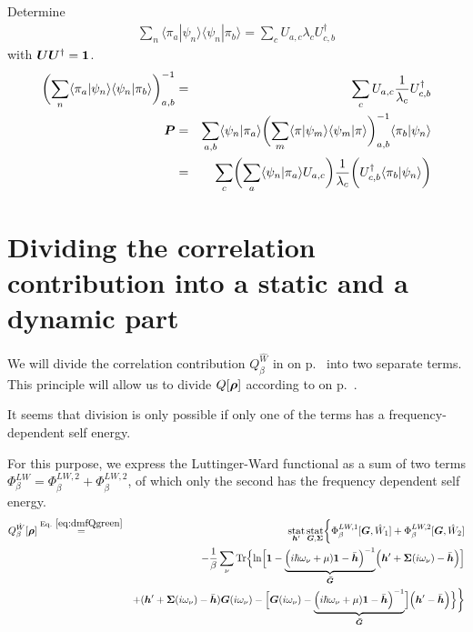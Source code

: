 \documentclass[11pt,a4paper]{report}
\begin{document}
Determine
\begin{eqnarray}
\sum_n\langle\pi_a|\psi_n\rangle\langle\psi_n|\pi_b\rangle
=\sum_{c} U_{a,c}\lambda_c U^\dagger_{c,b}
\end{eqnarray}
with $\bm{U}\bm{U}^\dagger=\bm{1}$.
\begin{eqnarray}
\biggl(\sum_n\langle\pi_a|\psi_n\rangle
\langle\psi_n|\pi_b\rangle\biggr)^{-1}_{a,b}
&=&\sum_{c} U_{a,c}\frac{1}{\lambda_c} U^\dagger_{c,b}
\nonumber\\
\bm{P}&=&
\sum_{a,b}\langle\psi_n|\pi_a\rangle
\biggl(\sum_m\langle\pi|\psi_m\rangle
\langle\psi_m|\pi\rangle\biggr)^{-1}_{a,b}
\langle\pi_b|\psi_n\rangle
\nonumber\\
&=&
\sum_{c}\biggl(\sum_a\langle\psi_n|\pi_a\rangle 
U_{a,c}\biggr)
\frac{1}{\lambda_c} 
\biggl(U^\dagger_{c,b}\langle\pi_b|\psi_n\rangle\biggr)
\end{eqnarray}




\chapter{Dividing the correlation contribution into a static and a dynamic part}
\label{sec:sdlitcorrelation}
We will divide the correlation contribution $Q^{\hat{W}}_\beta$ in
 on p.~\pageref{eq:dmfQgreen} into two separate
terms. This principle will allow us to divide $Q[\bm{\rho}]$
according to  on p.~\pageref{eq:splitq}.

It seems that division is only possible if only one of the
terms has a frequency-dependent self energy.

For this purpose, we express the Luttinger-Ward functional as a sum
of two terms $\Phi^{LW}_\beta=\Phi^{LW,2}_\beta+\Phi^{LW,2}_\beta$, of
which only the second has the frequency dependent self energy.
\begin{eqnarray}
Q^{\hat{W}}_\beta[\mat{\rho}]
&\eqrel{eq:dmfQgreen}{=}&
\stat_{\mat{h}'}\stat_{\mat{G},\mat{\Sigma}}
\biggl\lbrace
\Phi^{LW,1}_\beta[\mat{G},\hat{W}_1]
+\Phi^{LW,2}_\beta[\mat{G},\hat{W}_2]
\nonumber\\
&&-\frac{1}{\beta}\sum_\nu\Tr\Bigl\lbrace
\ln\Bigl[
\mat{1}-
\underbrace{
\Bigl(i\hbar\omega_\nu+\mu)\mat{1}-\bar{\mat{h}}\Bigr)^{-1}
}_{\mat{\bar{G}}}
\Bigl(\mat{h}'+\mat{\Sigma}(i\omega_\nu)-\bar{\mat{h}}\Bigr)
\Bigr]
\nonumber\\&&
+(\mat{h}'+\mat{\Sigma}(i\omega_\nu)-\bar{\mat{h}})\mat{G}(i\omega_\nu)
-
\Bigl[
\mat{G}(i\omega_\nu)
-\underbrace{
\Bigl(i\hbar\omega_\nu+\mu)\mat{1}-\bar{\mat{h}}\Bigr)^{-1}
}_{\mat{\bar{G}}}
\Bigr]
\Bigl(\mat{h}'-\bar{\mat{h}}\Bigr)\Bigr\rbrace
\biggr\rbrace
\nonumber\\
\label{eq:dmfQgreenbeforedivision}
\end{eqnarray}
\end{document}
